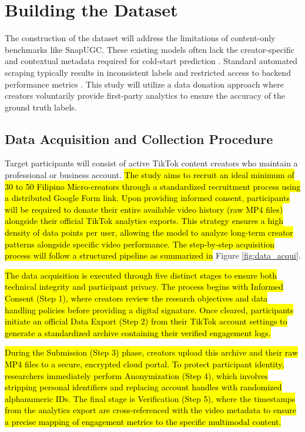 \section{Building the Dataset}

The construction of the dataset will address the limitations of content-only benchmarks like SnapUGC. These existing models often lack the creator-specific and contextual metadata required for cold-start prediction \cite{li2024delving}. Standard automated scraping typically results in inconsistent labels and restricted access to backend performance metrics \cite{li2025vquala}. This study will utilize a data donation approach where creators voluntarily provide first-party analytics to ensure the accuracy of the ground truth labels.

\subsection{Data Acquisition and Collection Procedure}

Target participants will consist of active TikTok content creators who maintain a professional or business account. \hl{The study aims to recruit an ideal minimum of 30 to 50 Filipino Micro-creators through a standardized recruitment process using a distributed Google Form link. Upon providing informed consent, participants will be required to donate their entire available video history (raw MP4 files) alongside their official TikTok analytics exports. This strategy ensures a high density of data points per user, allowing the model to analyze long-term creator patterns alongside specific video performance. The step-by-step acquisition process will follow a structured pipeline as summarized in } Figure \ref{fig:data_acqui}.

\hl{The data acquisition is executed through five distinct stages to ensure both technical integrity and participant privacy. The process begins with Informed Consent (Step 1), where creators review the research objectives and data handling policies before providing a digital signature. Once cleared, participants initiate an official Data Export (Step 2) from their TikTok account settings to generate a standardized archive containing their verified engagement logs.}

\hl{During the Submission (Step 3) phase, creators upload this archive and their raw MP4 files to a secure, encrypted cloud portal. To protect participant identity, researchers immediately perform Anonymization (Step 4), which involves stripping personal identifiers and replacing account handles with randomized alphanumeric IDs. The final stage is Verification (Step 5), where the timestamps from the analytics export are cross-referenced with the video metadata to ensure a precise mapping of engagement metrics to the specific multimodal content.}

